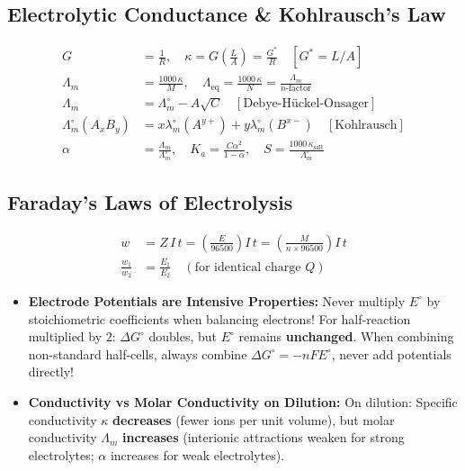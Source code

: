 \documentclass[10pt,twoside,openright]{book}
\begin{document}
\subsection{Electrolytic Conductance \& Kohlrausch's Law}

\begin{formulabox}
\begin{align}
  G &= \frac{1}{R}, \quad \kappa = G\left(\frac{L}{A}\right) = \frac{G^*}{R} \quad [G^* = L/A] \\
  \Lambda_m &= \frac{1000\,\kappa}{M}, \quad \Lambda_{\text{eq}} = \frac{1000\,\kappa}{N} = \frac{\Lambda_m}{n\text{-factor}} \\
  \Lambda_m &= \Lambda_m^\circ - A\sqrt{C} \quad [\text{Debye-H\"uckel-Onsager}] \\
  \Lambda_m^\circ(A_x B_y) &= x \lambda_m^\circ(A^{y+}) + y \lambda_m^\circ(B^{x-}) \quad [\text{Kohlrausch}] \\
  \alpha &= \frac{\Lambda_m}{\Lambda_m^\circ}, \quad K_a = \frac{C \alpha^2}{1 - \alpha}, \quad S = \frac{1000\,\kappa_{\text{salt}}}{\Lambda_m^\circ}
\end{align}
\end{formulabox}

\subsection{Faraday's Laws of Electrolysis}

\begin{formulabox}
\begin{align}
  w &= Z\,I\,t = \left(\frac{E}{96500}\right)I\,t = \left(\frac{M}{n \times 96500}\right)I\,t \\
  \frac{w_1}{w_2} &= \frac{E_1}{E_2} \quad (\text{for identical charge } Q)
\end{align}
\end{formulabox}

\begin{trapbox}
\begin{itemize}
  \item \textbf{Electrode Potentials are Intensive Properties:} Never multiply $E^\circ$ by stoichiometric coefficients when balancing electrons! For half-reaction multiplied by $2$: $\Delta G^\circ$ doubles, but $E^\circ$ remains \textbf{unchanged}. When combining non-standard half-cells, always combine $\Delta G^\circ = -nFE^\circ$, never add potentials directly!
  \item \textbf{Conductivity vs Molar Conductivity on Dilution:} On dilution: Specific conductivity $\kappa$ \textbf{decreases} (fewer ions per unit volume), but molar conductivity $\Lambda_m$ \textbf{increases} (interionic attractions weaken for strong electrolytes; $\alpha$ increases for weak electrolytes).
\end{itemize}
\end{trapbox}
\end{document}

